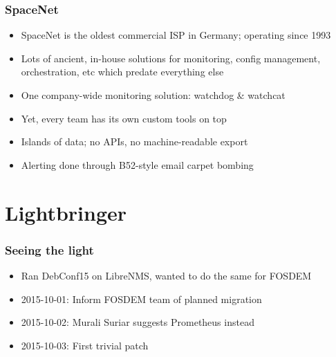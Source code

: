 \documentclass[t]{beamer}
\begin{document}
\begin{frame}
	\frametitle{SpaceNet}
	\begin{itemize}
		\item SpaceNet is the oldest commercial ISP in Germany; operating since 1993
		\item Lots of ancient, in-house solutions for monitoring, config management, orchestration, etc which predate everything else
		\item One company-wide monitoring solution: watchdog \& watchcat
		\item Yet, every team has its own custom tools on top
		\item Islands of data; no APIs, no machine-readable export
		\item Alerting done through B52-style email carpet bombing
	\end{itemize}
\end{frame}


% 

\section{Lightbringer}

\begin{frame}
	\frametitle{Seeing the light}
	\begin{itemize}
		\item Ran DebConf15 on LibreNMS, wanted to do the same for FOSDEM
		\item 2015-10-01: Inform FOSDEM team of planned migration
		\item 2015-10-02: Murali Suriar suggests Prometheus instead
		\item 2015-10-03: First trivial patch
	\end{itemize}
\end{frame}
\end{document}
